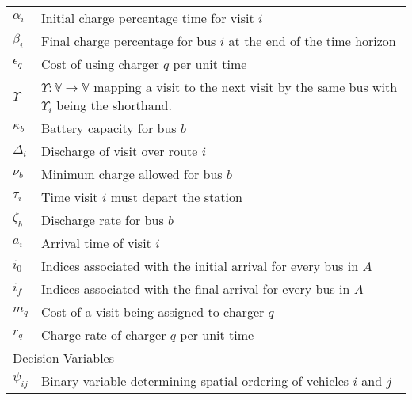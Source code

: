 \documentclass[11pt,a4paper,final]{article}
\begin{document}
\begin{table}[!htpb]
\begin{tabularx}{\textwidth}{l l}
    $\alpha_i$ & Initial charge percentage time for visit $i$                                                                   \\
    $\beta_i$ & Final charge percentage for bus $i$ at the end of the time horizon                                             \\
    $\epsilon_q$ & Cost of using charger $q$ per unit time                                                                        \\
    $\Upsilon$   & $\Upsilon: \mathbb{V} \rightarrow \mathbb{V}$ mapping a visit to the next visit by the same bus with $\Upsilon_i$ being the shorthand. \\
    $\kappa_b$ & Battery capacity for bus $b$                                                                                   \\
    $\Delta_i$ & Discharge of visit over route $i$                                                                              \\
    $\nu_b$ & Minimum charge allowed for bus $b$                                                                             \\
    $\tau_i$ & Time visit $i$ must depart the station                                                                         \\
    $\zeta_b$ & Discharge rate for bus $b$                                                                                     \\
    $a_i$ & Arrival time of visit  $i$                                                                                     \\
    $i_0$ & Indices associated with the initial arrival for every bus in $A$                                               \\
    $i_f$ & Indices associated with the final arrival for every bus in $A$                                                 \\
    $m_q$ & Cost of a visit being assigned to charger $q$                                                                  \\
    $r_q$ & Charge rate of charger $q$ per unit time                                                                       \\
    \hline
    \multicolumn{2}{l}{Decision Variables}                                                                                 \\
    $\psi_{ij}$ & Binary variable determining spatial ordering of vehicles $i$ and $j$                                       \\

\end{tabularx}
\end{table}
\end{document}
